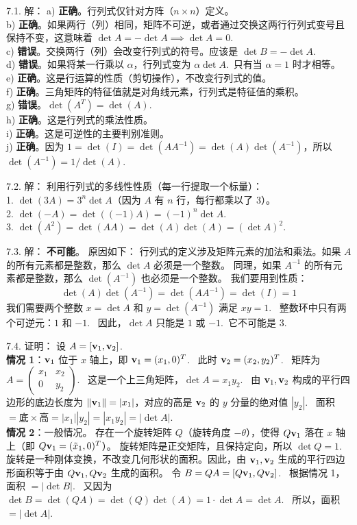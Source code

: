 \begin{exer}
\vspace{5ex}


7.1. 解：
a) \textbf{正确}。行列式仅针对方阵（$n \times n$）定义。\\
b) \textbf{正确}。如果两行（列）相同，矩阵不可逆，或者通过交换这两行行列式变号且保持不变，这意味着 $\det A = - \det A \implies \det A = 0$.~\\
c) \textbf{错误}。交换两行（列）会改变行列式的符号。应该是 $\det B = - \det A$.~\\
d) \textbf{错误}。如果将某一行乘以 $\alpha$，行列式变为 $\alpha \det A$.~只有当 $\alpha = 1$ 时才相等。\\
e) \textbf{正确}。这是行运算的性质（剪切操作），不改变行列式的值。\\
f) \textbf{正确}。三角矩阵的特征值就是对角线元素，行列式是特征值的乘积。\\
g) \textbf{错误}。$\det(A^T) = \det(A)$.~\\
h) \textbf{正确}。这是行列式的乘法性质。\\
i) \textbf{正确}。这是可逆性的主要判别准则。\\
j) \textbf{正确}。因为 $1 = \det(I) = \det(A A^{-1}) = \det(A)\det(A^{-1})$，所以 $\det(A^{-1}) = 1/\det(A)$.~

7.2. 解：
利用行列式的多线性性质（每一行提取一个标量）：\\
1.  $\det(3A) = 3^n \det A$（因为 $A$ 有 $n$ 行，每行都乘以了 3）。\\
2.  $\det(-A) = \det((-1)A) = (-1)^n \det A$.~\\
3.  $\det(A^2) = \det(AA) = \det(A)\det(A) = (\det A)^2$.~

7.3. 解：
\textbf{不可能}。
原因如下：
行列式的定义涉及矩阵元素的加法和乘法。如果 $A$ 的所有元素都是整数，那么 $\det A$ 必须是一个整数。
同理，如果 $A^{-1}$ 的所有元素都是整数，那么 $\det(A^{-1})$ 也必须是一个整数。
我们要用到性质：
$$ \det(A) \det(A^{-1}) = \det(A A^{-1}) = \det(I) = 1 $$
我们需要两个整数 $x = \det A$ 和 $y = \det(A^{-1})$ 满足 $xy = 1$.~
整数环中只有两个可逆元：$1$ 和 $-1$.~
因此，$\det A$ 只能是 $1$ 或 $-1$.~它不可能是 $3$.~

7.4. 证明：
设 $A = [\mathbf{v}_1, \mathbf{v}_2]$.~\\
\textbf{情况 1}：$\mathbf{v}_1$ 位于 $x$ 轴上，即 $\mathbf{v}_1 = (x_1, 0)^T$.~
此时 $\mathbf{v}_2 = (x_2, y_2)^T$.~
矩阵为 $A = \begin{pmatrix} x_1 & x_2 \\ 0 & y_2 \end{pmatrix}$.~
这是一个上三角矩阵，$\det A = x_1 y_2$.~
由 $\mathbf{v}_1, \mathbf{v}_2$ 构成的平行四边形的底边长度为 $\|\mathbf{v}_1\| = |x_1|$，对应的高是 $\mathbf{v}_2$ 的 $y$ 分量的绝对值 $|y_2|$.~
面积 $= \text{底} \times \text{高} = |x_1| |y_2| = |x_1 y_2| = |\det A|$.~\\
\textbf{情况 2}：一般情况。
存在一个旋转矩阵 $Q$（旋转角度 $-\theta$），使得 $Q \mathbf{v}_1$ 落在 $x$ 轴上（即 $Q\mathbf{v}_1 = (\tilde{x}_1, 0)^T$）。
旋转矩阵是正交矩阵，且保持定向，所以 $\det Q = 1$.~
旋转是一种刚体变换，不改变几何形状的面积。因此，由 $\mathbf{v}_1, \mathbf{v}_2$ 生成的平行四边形面积等于由 $Q\mathbf{v}_1, Q\mathbf{v}_2$ 生成的面积。
令 $B = Q A = [Q\mathbf{v}_1, Q\mathbf{v}_2]$.~
根据情况 1，面积 $= |\det B|$.~
又因为 $\det B = \det(QA) = \det(Q)\det(A) = 1 \cdot \det A = \det A$.~
所以，面积 $= |\det A|$.~


\end{exer}
